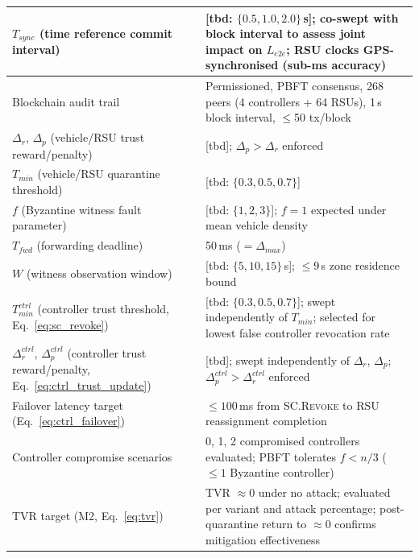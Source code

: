 \documentclass[12pt, a4paper]{report}
\begin{document}
{{\begin{longtable}{|m{5.0cm}|m{9.0cm}|}
            \hline
            $T_{sync}$ (time reference commit interval) & [tbd: $\{0.5, 1.0, 2.0\}$\,s]; co-swept with block interval to assess joint impact on $L_{e2e}$; RSU clocks GPS-synchronised (sub-ms accuracy) \\
            \hline
            Blockchain audit trail & Permissioned, PBFT consensus, 268 peers (4 controllers + 64 RSUs), 1\,s block interval, $\leq$50 tx/block \\
            \hline
            $\Delta_r$, $\Delta_p$ (vehicle/RSU trust reward/penalty) & [tbd]; $\Delta_p > \Delta_r$ enforced \\
            \hline
            $T_{min}$ (vehicle/RSU quarantine threshold) & [tbd: $\{0.3, 0.5, 0.7\}$] \\
            \hline
            $f$ (Byzantine witness fault parameter) & [tbd: $\{1, 2, 3\}$]; $f{=}1$ expected under mean vehicle density \\
            \hline
            $T_{fwd}$ (forwarding deadline) & 50\,ms ($= \Delta_{max}$) \\
            \hline
            $W$ (witness observation window) & [tbd: $\{5, 10, 15\}$\,s]; $\leq 9$\,s zone residence bound \\
                
    
             \hline
            $T_{min}^{ctrl}$ (controller trust threshold,
            Eq.~\ref{eq:sc_revoke}) &
            [tbd: $\{0.3, 0.5, 0.7\}$]; swept
            independently of $T_{min}$; selected for
            lowest false controller revocation rate \\
            \hline
            $\Delta_r^{ctrl}$, $\Delta_p^{ctrl}$
            (controller trust reward/penalty,
            Eq.~\ref{eq:ctrl_trust_update}) &
            [tbd]; swept independently of $\Delta_r$,
            $\Delta_p$; $\Delta_p^{ctrl} >
            \Delta_r^{ctrl}$ enforced \\
            \hline
            Failover latency target
            (Eq.~\ref{eq:ctrl_failover}) &
            $\leq 100$\,ms from \textsc{SC.Revoke}
            to RSU reassignment completion \\
            \hline
            Controller compromise scenarios &
            0, 1, 2 compromised controllers evaluated;
            PBFT tolerates $f < n/3$ ($\leq 1$
            Byzantine controller) \\
             \hline
           TVR target (M2, Eq.~\ref{eq:tvr}) &
            TVR $\approx 0$ under no attack;
            evaluated per variant and attack percentage;
            post-quarantine return to $\approx 0$
            confirms mitigation effectiveness \\


\end{longtable}}}
\end{document}
